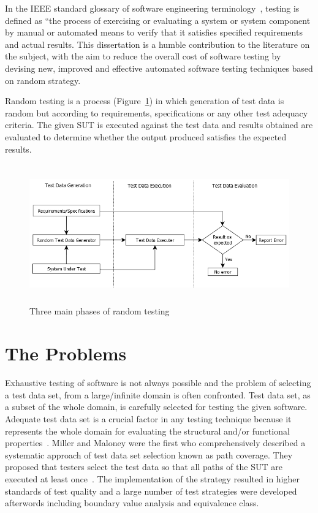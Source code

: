 In the IEEE standard glossary of software engineering terminology~\cite{american1984}, testing is defined as ``the process of exercising or evaluating a system or system component by manual or automated means to verify that it satisfies specified requirements and actual results. This dissertation is a humble contribution to the literature on the subject, with the aim to reduce the overall cost of software testing by devising new, improved and effective automated software testing techniques based on random strategy.

Random testing is a process (Figure~\ref{fig:SoftwareTesting1}) in which generation of test data is random but according to requirements, specifications or any other test adequacy criteria. The given SUT is executed against the test data and results obtained are evaluated to determine whether the output produced satisfies the expected results.
\\
\begin{figure}[h]
	\centering
		\includegraphics[width=14cm, height=6cm ]{chapter1/SoftwareTesting1.png}
		\caption{Three main phases of random testing}
	\label{fig:SoftwareTesting1}
\end{figure}

\section{The Problems}
Exhaustive testing of software is not always possible and the problem of selecting a test data set, from a large/infinite domain is often confronted. Test data set, as a subset of the whole domain, is carefully selected for testing the given software. Adequate test data set is a crucial factor in any testing technique because it represents the whole domain for evaluating the structural and/or functional properties~\cite{howden1986, mccabe1983}. Miller and Maloney were the first who comprehensively described a systematic approach of test data set selection known as path coverage. They proposed that testers select the test data so that all paths of the SUT are executed at least once~\cite{Miller1963}. The implementation of the strategy resulted in higher standards of test quality and a large number of test strategies were developed afterwords including boundary value analysis and equivalence class.

